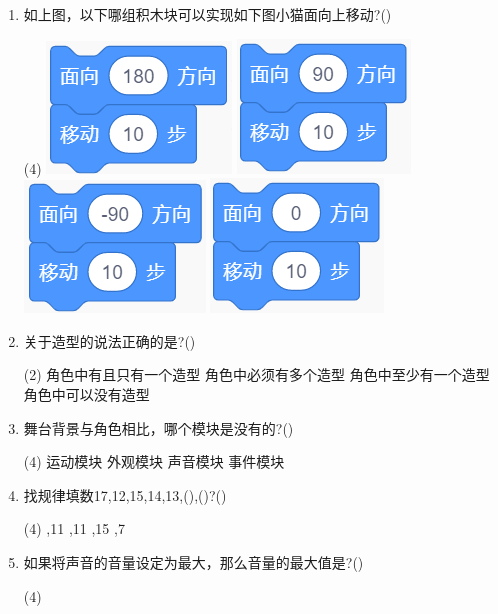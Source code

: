 \documentclass[10pt, a4paper]{article}
\begin{document}
\begin{enumerate}
        \item 如上图，以下哪组积木块可以实现如下图小猫面向上移动?(\qquad)
        \begin{tasks}(4)
            \task \includegraphics[width=.1\textwidth]{21a.png}
            \task \includegraphics[width=.1\textwidth]{21b.png}
            \task \includegraphics[width=.1\textwidth]{21c.png}
            \task \includegraphics[width=.1\textwidth]{21d.png}
        \end{tasks}

        \newpage
        \item 关于造型的说法正确的是?(\qquad)
        \begin{tasks}(2)
            \task 角色中有且只有一个造型
            \task 角色中必须有多个造型
            \task 角色中至少有一个造型
            \task 角色中可以没有造型
        \end{tasks}

        \item 舞台背景与角色相比，哪个模块是没有的?(\qquad)
        \begin{tasks}(4)
            \task 运动模块
            \task 外观模块
            \task 声音模块
            \task 事件模块
        \end{tasks}

        \item 找规律填数17,12,15,14,13,(\quad),(\quad)?(\qquad)
        \begin{tasks}(4)
            ,11
            ,11
            ,15
            ,7
        \end{tasks}
        
        \item 如果将声音的音量设定为最大，那么音量的最大值是?(\qquad)
        \begin{tasks}(4)
        \end{tasks}
    \end{enumerate}
\end{document}
